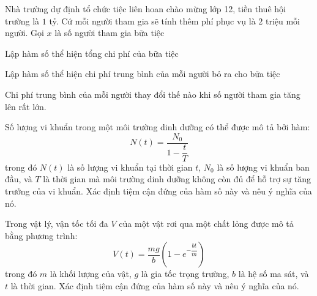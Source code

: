 \begin{ex}
    Nhà trường dự định tổ chức tiệc liên hoan chào mừng lớp 12, tiền thuê hội trường là $1$ tỷ. Cứ mỗi người tham gia sẽ tính thêm phí phục vụ là $2$ triệu mỗi người. Gọi $x$ là số người tham gia bữa tiệc
    \begin{listEX}
        \item Lập hàm số thể hiện tổng chi phí của bữa tiệc
        \item Lập hàm số thể hiện chi phí trung bình của mỗi người bỏ ra cho bữa tiệc
        \item Chi phí trung bình của mỗi người thay đổi thế nào khi số người tham gia tăng lên rất lớn.
    \end{listEX}
\end{ex}
\begin{ex}
    Số lượng vi khuẩn trong một môi trường dinh dưỡng có thể được mô tả bởi hàm:
    \[
    N(t) = \dfrac{N_0}{1 - \dfrac{t}{T}}
    \]
    trong đó \( N(t) \) là số lượng vi khuẩn tại thời gian \( t \), \( N_0 \) là số lượng vi khuẩn ban đầu, và \( T \) là thời gian mà môi trường dinh dưỡng không còn đủ để hỗ trợ sự tăng trưởng của vi khuẩn. Xác định tiệm cận đứng của hàm số này và nêu ý nghĩa của nó.
\end{ex}
\begin{ex}
    Trong vật lý, vận tốc tối đa \(V\) của một vật rơi qua một chất lỏng được mô tả bằng phương trình:
    \[
    V(t) = \frac{mg}{b} \left(1 - e^{-\dfrac{bt}{m}}\right)
    \]
    trong đó \(m\) là khối lượng của vật, \(g\) là gia tốc trọng trường, \(b\) là hệ số ma sát, và \(t\) là thời gian. Xác định tiệm cận đứng của hàm số này và nêu ý nghĩa của nó.
\end{ex}

